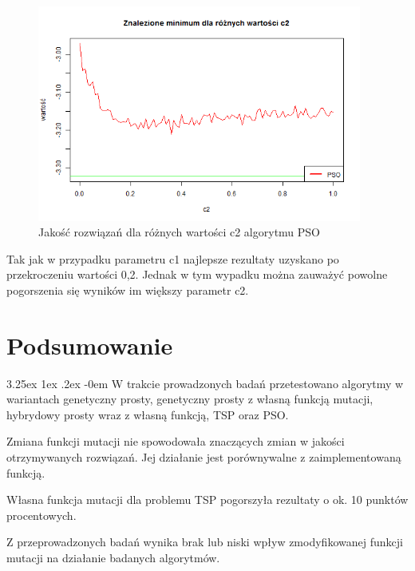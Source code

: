 \documentclass[11pt, a4paper]{article}
\makeatletter
\newcommand{\fbi}{\leavevmode{\parindent=1em\indent}}
\renewcommand\paragraph{\@startsection{paragraph}{5}{\z@}
  {3.25ex \@plus1ex \@minus.2ex}
  {-0em}
  {\normalfont\normalsize\bfseries}}
\makeatother
\begin{document}
\begin{figure}[H]
	\centering
	\includegraphics[width=0.95\textwidth]{./assets/Hartman6c2.png}
	\caption{Jakość rozwiązań dla różnych wartości c2 algorytmu PSO}
	\label{fig:psoc2}
\end{figure}

\fbi
Tak jak w przypadku parametru c1 najlepsze rezultaty uzyskano po przekroczeniu wartości 0,2. Jednak w tym wypadku można zauważyć powolne pogorszenia się wyników im większy parametr c2. 

\newpage
\section{Podsumowanie}
\paragraph{}
W trakcie prowadzonych badań przetestowano algorytmy w wariantach genetyczny prosty, genetyczny prosty z własną funkcją mutacji, hybrydowy prosty wraz z własną funkcją, TSP oraz PSO.

\fbi
Zmiana funkcji mutacji nie spowodowała znaczących zmian w jakości otrzymywanych rozwiązań. Jej działanie jest porównywalne z zaimplementowaną funkcją.

\fbi
Własna funkcja mutacji dla problemu TSP pogorszyła rezultaty o ok. 10 punktów procentowych.

\fbi
Z przeprowadzonych badań wynika brak lub niski wpływ zmodyfikowanej funkcji mutacji na działanie badanych algorytmów.
\end{document}
